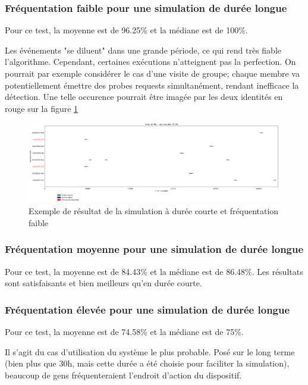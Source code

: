 \subsubsection{Fréquentation faible pour une simulation de durée longue}
Pour ce test, la moyenne est de 96.25\% et la médiane est de 100\%.

Les événements "se diluent" dans une grande période, ce qui rend très fiable l'algorithme. 
Cependant, certaines exécutions n'atteignent pas la perfection. On pourrait par exemple considérer le cas d'une 
visite de groupe; chaque membre va potentiellement émettre des probes requests simultanément, rendant inefficace la détection.
Une telle occurence pourrait être imagée par les deux identités en rouge sur la figure \ref{fig:simulation-long-low}
\clearpage
\newpage
\thispagestyle{empty}
\begin{landscape}
    \centering
\thispagestyle{empty}
\begin{figure}[h]
	\includegraphics[width=\linewidth]{images/tests/exemple_longue_faible.png}
	\caption{Exemple de résultat de la simulation à durée courte et fréquentation faible}
	\label{fig:simulation-long-low}
\end{figure}
\end{landscape}

\subsubsection{Fréquentation moyenne pour une simulation de durée longue}
Pour ce test, la moyenne est de 84.43\% et la médiane est de 86.48\%.
Les résultats sont satisfaisants et bien meilleurs qu'en durée courte.

\subsubsection{Fréquentation élevée pour une simulation de durée longue}
Pour ce test, la moyenne est de 74.58\% et la médiane est de 75\%.

Il s'agit du cas d'utilisation du système le plus probable. 
Posé sur le long terme (bien plus que 30h, mais cette durée a été choisie pour faciliter la simulation), beaucoup de gens fréquenteraient l'endroit d'action du dispositif.

